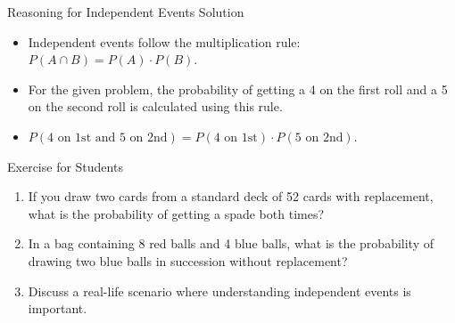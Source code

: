\begin{frame}{Reasoning for Independent Events Solution}
  \begin{itemize}
    \item Independent events follow the multiplication rule: \(P(A \cap B) = P(A) \cdot P(B)\).
    \item For the given problem, the probability of getting a 4 on the first roll and a 5 on the second roll is calculated using this rule.
    \item \(P(\text{4 on 1st and 5 on 2nd}) = P(\text{4 on 1st}) \cdot P(\text{5 on 2nd})\).
  \end{itemize}
\end{frame}

\begin{frame}{Exercise for Students}
  \begin{enumerate}
    \item If you draw two cards from a standard deck of 52 cards with replacement, what is the probability of getting a spade both times?
    \item In a bag containing 8 red balls and 4 blue balls, what is the probability of drawing two blue balls in succession without replacement?
    \item Discuss a real-life scenario where understanding independent events is important.
  \end{enumerate}
\end{frame}
